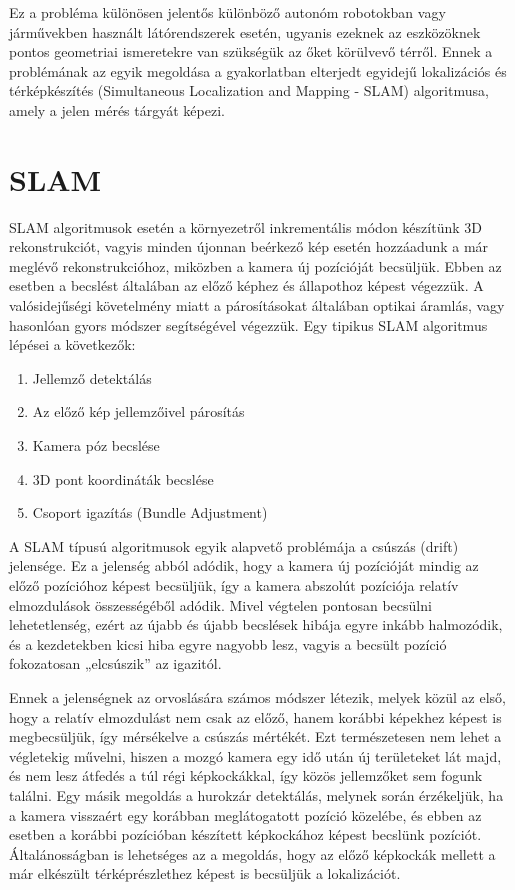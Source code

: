 \documentclass[12pt,a4paper,oneside]{report}             %
\begin{document}
Ez a probléma különösen jelentős különböző autonóm robotokban vagy járművekben használt látórendszerek esetén, ugyanis ezeknek az eszközöknek pontos geometriai ismeretekre van szükségük az őket körülvevő térről. Ennek a problémának az egyik megoldása a gyakorlatban elterjedt egyidejű lokalizációs és térképkészítés (Simultaneous Localization and Mapping - SLAM) algoritmusa, amely a jelen mérés tárgyát képezi.



\section{SLAM}

SLAM algoritmusok esetén a környezetről inkrementális módon készítünk 3D rekonstrukciót, vagyis minden újonnan beérkező kép esetén hozzáadunk a már meglévő rekonstrukcióhoz, miközben a kamera új pozícióját becsüljük. Ebben az esetben a becslést általában az előző képhez és állapothoz képest végezzük. A valósidejűségi követelmény miatt a párosításokat általában optikai áramlás, vagy hasonlóan gyors módszer segítségével végezzük. Egy tipikus SLAM algoritmus lépései a következők:

\begin{enumerate} 
	\item Jellemző detektálás
	
	\item Az előző kép jellemzőivel párosítás
	
	\item Kamera póz becslése
	
	\item 3D pont koordináták becslése
	
	\item Csoport igazítás (Bundle Adjustment)
	
\end{enumerate}

A SLAM típusú algoritmusok egyik alapvető problémája a csúszás (drift) jelensége. Ez a jelenség abból adódik, hogy a kamera új pozícióját mindig az előző pozícióhoz képest becsüljük, így a kamera abszolút pozíciója relatív elmozdulások összességéből adódik. Mivel végtelen pontosan becsülni lehetetlenség, ezért az újabb és újabb becslések hibája egyre inkább halmozódik, és a kezdetekben kicsi hiba egyre nagyobb lesz, vagyis a becsült pozíció fokozatosan „elcsúszik” az igazitól.

Ennek a jelenségnek az orvoslására számos módszer létezik, melyek közül az első, hogy a relatív elmozdulást nem csak az előző, hanem korábbi képekhez képest is megbecsüljük, így mérsékelve a csúszás mértékét. Ezt természetesen nem lehet a végletekig művelni, hiszen a mozgó kamera egy idő után új területeket lát majd, és nem lesz átfedés a túl régi képkockákkal, így közös jellemzőket sem fogunk találni. Egy másik megoldás a hurokzár detektálás, melynek során érzékeljük, ha a kamera visszaért egy korábban meglátogatott pozíció közelébe, és ebben az esetben a korábbi pozícióban készített képkockához képest becslünk pozíciót. Általánosságban is lehetséges az a megoldás, hogy az előző képkockák mellett a már elkészült térképrészlethez képest is becsüljük a lokalizációt.
\end{document}
